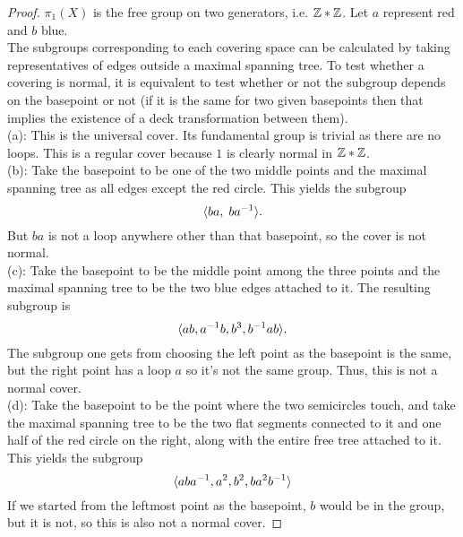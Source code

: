 \documentclass{amsart}
\begin{document}
	\begin{proof}
		$\pi_1(X)$ is the free group on two generators, i.e. $\mathbb{Z}\ast\mathbb{Z}$. Let $a$ represent red and $b$ blue.\\
		
		The subgroups corresponding to each covering space can be calculated by taking representatives of edges outside a maximal spanning tree. To test whether a covering is normal, it is equivalent to test whether or not the subgroup depends on the basepoint or not (if it is the same for two given basepoints then that implies the existence of a deck transformation between them).\\
		
		(a): This is the universal cover. Its fundamental group is trivial as there are no loops. This is a regular cover because $1$ is clearly normal in $\mathbb{Z}\ast \mathbb{Z}$.\\
		
		(b): Take the basepoint to be one of the two middle points and the maximal spanning tree as all edges except the red circle. This yields the subgroup
		$$
		\langle ba, \; ba^{-1}\rangle.
		$$
		But $ba$ is not a loop anywhere other than that basepoint, so the cover is not normal.\\
		
		(c): Take the basepoint to be the middle point among the three points and the maximal spanning tree to be the two blue edges attached to it. The resulting subgroup is
		$$
		\langle ab,a^{-1}b,b^3,b^{-1}ab\rangle.
		$$
		The subgroup one gets from choosing the left point as the basepoint is the same, but the right point has a loop $a$ so it's not the same group. Thus, this is not a normal cover.\\
		
		(d): Take the basepoint to be the point where the two semicircles touch, and take the maximal spanning tree to be the two flat segments connected to it and one half of the red circle on the right, along with the entire free tree attached to it. This yields the subgroup
		$$
		\langle aba^{-1},a^2,b^2,ba^2b^{-1}\rangle
		$$
		If we started from the leftmost point as the basepoint, $b$ would be in the group, but it is not, so this is also not a normal cover.
		
	\end{proof}\\
	
\end{document}
